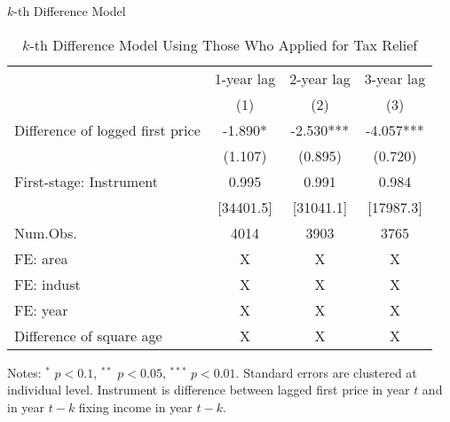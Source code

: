 \documentclass[
  ignorenonframetext,
  aspectratio=169,
]{beamer}
\begin{document}
\begin{frame}{\(k\)-th Difference Model}
\protect\hypertarget{k-th-difference-model}{}
\begin{table}

\caption{\label{tab:KdiffElasticity}$k$-th Difference Model Using Those Who Applied for Tax Relief}
\centering
\fontsize{8}{10}\selectfont
\begin{threeparttable}
\begin{tabular}[t]{lccc}
\toprule
\multicolumn{1}{c}{ } & \multicolumn{1}{c}{1-year lag} & \multicolumn{1}{c}{2-year lag} & \multicolumn{1}{c}{3-year lag} \\
\cmidrule(l{3pt}r{3pt}){2-2} \cmidrule(l{3pt}r{3pt}){3-3} \cmidrule(l{3pt}r{3pt}){4-4}
  & (1) & (2) & (3)\\
\midrule
Difference of logged first price & -1.890* & -2.530*** & -4.057***\\
 & (1.107) & (0.895) & (0.720)\\
\midrule
First-stage: Instrument & 0.995 & 0.991 & 0.984\\
 & [34401.5] & [31041.1] & [17987.3]\\
Num.Obs. & 4014 & 3903 & 3765\\
FE: area & X & X & X\\
FE: indust & X & X & X\\
FE: year & X & X & X\\
Difference of square age & X & X & X\\
\bottomrule
\end{tabular}
\begin{tablenotes}
\item Notes: $^{*}$ $p < 0.1$, $^{**}$ $p < 0.05$, $^{***}$ $p < 0.01$. Standard errors are clustered at individual level. Instrument is difference between lagged first price in year $t$ and in year $t - k$ fixing income in year $t - k$.
\end{tablenotes}
\end{threeparttable}
\end{table}
\end{frame}
\end{document}
